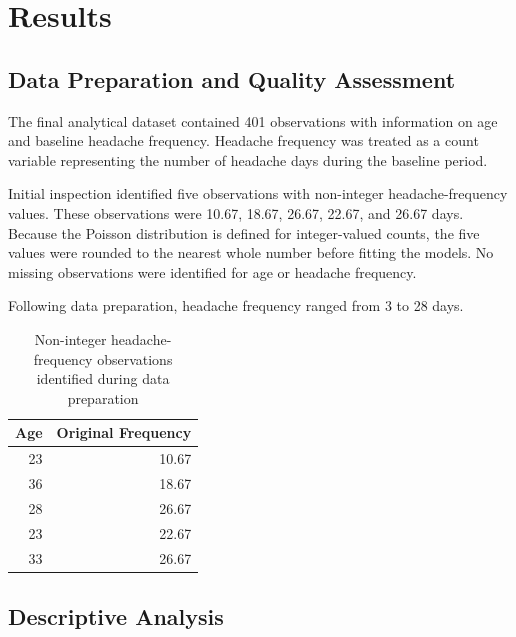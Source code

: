 
\section{Results}
\label{sec:results}

\subsection{Data Preparation and Quality Assessment}

The final analytical dataset contained 401 observations with
information on age and baseline headache frequency. Headache
frequency was treated as a count variable representing the number of
headache days during the baseline period.

Initial inspection identified five observations with non-integer
headache-frequency values. These observations were 10.67, 18.67,
26.67, 22.67, and 26.67 days. Because the Poisson distribution is
defined for integer-valued counts, the five values were rounded to
the nearest whole number before fitting the models. No missing
observations were identified for age or headache frequency.

Following data preparation, headache frequency ranged from 3 to
28 days.

\begin{table}[H]
\centering
\caption{Non-integer headache-frequency observations identified during data preparation}
\label{tab:noninteger}
\begin{tabular}{rr}
\toprule
Age & Original Frequency \\
\midrule
23 & 10.67 \\
36 & 18.67 \\
28 & 26.67 \\
23 & 22.67 \\
33 & 26.67 \\
\bottomrule
\end{tabular}
\end{table}

\subsection{Descriptive Analysis}

